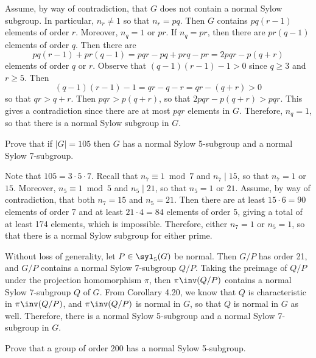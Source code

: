 \begin{sol}
	Assume, by way of contradiction, that $G$ does not contain a normal Sylow subgroup. In particular, $n_r \neq 1$ so that $n_r = pq$. Then $G$ contains $pq(r - 1)$ elements of order $r$. Moreover, $n_q = 1$ or $pr$. If $n_q = pr$, then there are $pr(q - 1)$ elements of order $q$. Then there are 
	\[pq(r - 1) + pr(q - 1) = pqr - pq + prq - pr = 2pqr - p(q + r)\]
	elements of order $q$ or $r$. Observe that $(q - 1)(r - 1) - 1 > 0$ since $q \geq 3$ and $r \geq 5$. Then
	\[(q - 1)(r - 1) - 1 = qr - q - r = qr - (q + r) > 0\]
	so that $qr > q + r$. Then $pqr > p(q + r)$, so that $2pqr - p(q + r) > pqr$. This gives a contradiction since there are at most $pqr$ elements in $G$. Therefore, $n_q = 1$, so that there is a normal Sylow subgroup in $G$.
\end{sol}

\begin{exercise}\label{ex4.5.17}
	Prove that if $|G| = 105$ then $G$ has a normal Sylow 5-subgroup and a normal Sylow 7-subgroup.
\end{exercise}

\begin{sol}
	Note that $105 = 3 \cdot 5 \cdot 7$. Recall that $n_7 \equiv 1 \bmod 7$ and $n_7 \mid 15$, so that $n_7 = 1$ or $15$. Moreover, $n_5 \equiv 1 \bmod 5$ and $n_5 \mid 21$, so that $n_5 = 1$ or $21$. Assume, by way of contradiction, that both $n_7 = 15$ and $n_5 = 21$. Then there are at least $15 \cdot 6 = 90$ elements of order 7 and at least $21 \cdot 4 = 84$ elements of order 5, giving a total of at least 174 elements, which is impossible. Therefore, either $n_7 = 1$ or $n_5 = 1$, so that there is a normal Sylow subgroup for either prime.

	Without loss of generality, let $P \in \syl_5(G)$ be normal. Then $G/P$ has order 21, and $G/P$ contains a normal Sylow 7-subgroup $Q/P$. Taking the preimage of $Q/P$ under the projection homomorphism $\pi$, then $\pi\inv(Q/P)$ contains a normal Sylow 7-subgroup $Q$ of $G$. From Corollary 4.20, we know that $Q$ is characteristic in $\pi\inv(Q/P)$, and $\pi\inv(Q/P)$ is normal in $G$, so that $Q$ is normal in $G$ as well. Therefore, there is a normal Sylow 5-subgroup and a normal Sylow 7-subgroup in $G$.
\end{sol}

\begin{exercise}\label{ex4.5.18}
	Prove that a group of order 200 has a normal Sylow 5-subgroup.
\end{exercise}

